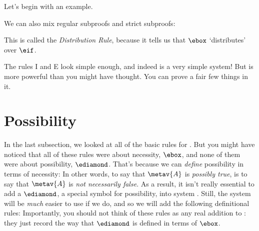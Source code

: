 Let's begin with an example.
\begin{fitchproof}
		\PR
		\PR
		\open
		\AS
		\close
\end{fitchproof}
We can also mix regular subproofs and strict subproofs:
\begin{fitchproof}
		\PR
		\open
		\AS
		\open
		\AS
		\close
		\close
		 
\end{fitchproof}
This is called the \emph{Distribution Rule}, because it tells us that $\ebox$ `distributes' over $\eif$.

The rules \ebox I and \ebox E look simple enough, and indeed \mlK{} is a very simple system! But \mlK{} is more powerful than you might have thought. You can prove a fair few things in it.

\section{Possibility}
\label{possibility}

In the last subsection, we looked at all of the basic rules for \mlK. But you might have noticed that all of these rules were about necessity, $\ebox$, and none of them were about possibility, $\ediamond$. That's because we can \emph{define} possibility in terms of necessity:
In other words, to say that $\metav{A}$ is \emph{possibly true}, is to say that $\metav{A}$ is \emph{not necessarily false}. As a result, it isn't really essential to add a $\ediamond$, a special symbol for possibility, into system \mlK. Still, the system will be \emph{much} easier to use if we do, and so we will add the following definitional rules:
Importantly, you should not think of these rules as any real addition to \mlK: they just record the way that $\ediamond$ is defined in terms of $\ebox$.


